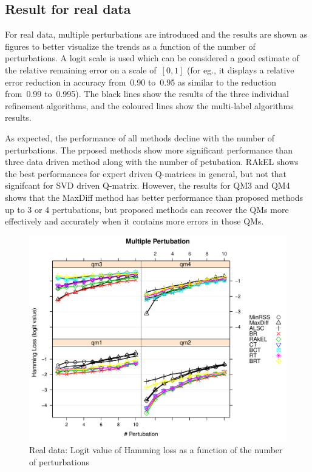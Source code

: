 \documentclass[11pt]{article}
\begin{document}
\subsection{Result for real data}
For real data, multiple perturbations are introduced and the results are shown as figures to better visualize the trends as a function of the number of perturbations.   A logit scale is used which can be considered a good estimate of the relative remaining error on a scale of~$[0,1]$ (for eg., it displays a relative error reduction in accuracy from~0.90 to~0.95 as similar to the reduction from~0.99 to~0.995). The black lines show the results of the three individual refinement algorithms, and the coloured lines show the multi-label algorithms results.  

As expected, the performance of all methods decline with the number of perturbations. The prposed methods show more significant performance than three data driven method along with the number of petubation. RAkEL shows the best performances for expert driven Q-matrices in general, but not that signifcant for SVD driven Q-matrix. However, the results for QM3 and QM4 shows that the MaxDiff method has better performance than proposed methods up to 3 or 4 pertubations, but proposed methods can recover the QMs more effectively and accurately when it contains more errors in those QMs.



\begin{figure}
  \centering
    \includegraphics[width=100 mm ,scale=0.25]{graph/HL.pdf}
  \caption{Real data: Logit value of Hamming loss as a function of the number of perturbations}\label{fig:HLforReal}
\end{figure}
\end{document}
